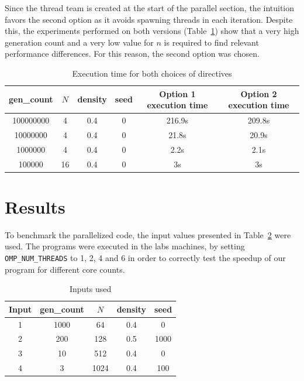 \documentclass{article}
\begin{document}
Since the thread team is created at the start of the parallel section, the intuition
favors the second option as it avoids spawning threads in each iteration.
Despite this, the experiments performed on both versions
(Table~\ref{omp-directive-choice}) show that a very high generation count and a
very low value for $n$ is required to find relevant performance differences. 
For this reason, the second option was chosen.

\begin{table}[h!]
	\centering
	\begin{tabular}{| c c c c c c||} 
	 \hline
	 gen\_count & $N$ & density & seed & Option 1 execution time & Option 2 execution time \\ [0.5ex] 
	 \hline\hline
	 100000000 & 4 & 0.4 & 0 & 216.9s & 209.8s \\ 
	 10000000 & 4 & 0.4 & 0 & 21.8s & 20.9s \\ 
	 1000000 & 4 & 0.4 & 0 & 2.2s & 2.1s\\
	 100000 & 16 & 0.4 & 0 & 3s & 3s\\ [1ex] 
	 \hline
	\end{tabular}
	\caption{Execution time for both choices of directives}
	\label{omp-directive-choice}
\end{table}

\section{Results}

To benchmark the parallelized code, the input values presented in Table~\ref{input-values}
were used. The programs were executed in the labs machines, by setting
\texttt{OMP\_NUM\_THREADS} to 1, 2, 4 and 6 in order to correctly test the
speedup of our program for different core counts.

\begin{table}[h!]
	\centering
	\begin{tabular}{||c c c c c||} 
	 \hline
	 Input & gen\_count & $N$ & density & seed  \\ [0.5ex] 
	 \hline\hline
	 1 & 1000 & 64 & 0.4 & 0 \\ 
	 2 & 200 & 128 & 0.5 & 1000 \\
	 3 & 10 & 512 & 0.4 & 0 \\ 
	 4 & 3 & 1024 & 0.4 & 100 \\ [1ex] 
	 \hline
	\end{tabular}
	\caption{Inputs used}
	\label{input-values}
\end{table}
\end{document}

